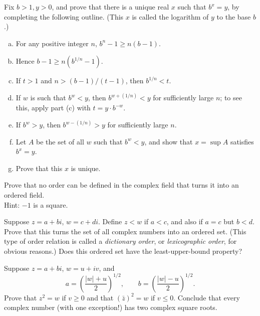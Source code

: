 \begin{myExercise}
    Fix $b>1, y>0$, and prove that there is a unique real $x$ such that $b^x =y$, by
    completing the following outline. (This $x$ is called the logarithm of $y$ to the base $b$.)
    \begin{enumerate}[(a)]
        \item For any positive integer $n$, $b^n - 1 \geq n(b- 1)$.
        \item Hence $b- 1 \geq n(b^{1/n}- 1)$.
        \item If $t>1$ and $n> (b-1)/(t- 1)$, then $b^{1/n} < t$.
        \item If $w$ is such that $b^w < y$, then $b^{w+(1/n)} < y$ for sufficiently large $n$; to see this, apply part (c) with $t =y \cdot b^{-w}$.
        \item If $b^w > y$, then $b^{w-(1/n)} > y$ for sufficiently large $n$.
        \item Let $A$ be the set of all $w$ such that $b^w < y$, and show that $x = \sup A$ satisfies $b^x =y$.
        \item Prove that this $x$ is unique.
    \end{enumerate}
\end{myExercise}


\begin{myExercise}
    Prove that no order can be defined in the complex field that turns it into an ordered field. \\
    Hint: $-1$ is a square.
\end{myExercise}

\begin{myExercise}
    Suppose $z=a+ bi$, $w=c+di$. Define $z<w$ if $a<c$, and also if $a=c$ but
    $b < d$. Prove that this turns the set of all complex numbers into an ordered set.
    (This type of order relation is called a \emph{dictionary order}, or \emph{lexicographic order}, for
    obvious reasons.) Does this ordered set have the least-upper-bound property?
\end{myExercise}

\begin{myExercise}    
    Suppose $z = a + bi$, $w =u + iv$, and
    \begin{equation*}
        a = \left(\frac{|w|+u}{2}\right)^{1/2},\qquad
        b = \left(\frac{|w|-u}{2}\right)^{1/2}.
    \end{equation*}
    Prove that $z^2 = w$ if $v \geq 0$ and that $(\bar{z})^2 = w$ if $v \leq 0$. Conclude that every complex
    number (with one exception!) has two complex square roots.
\end{myExercise}

